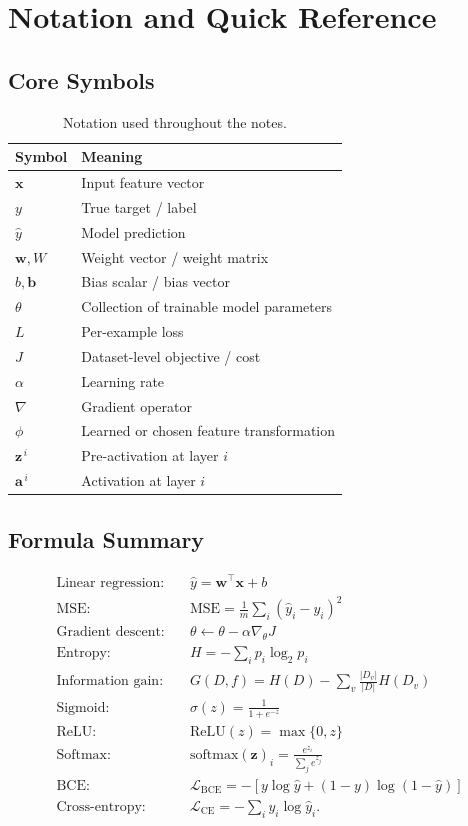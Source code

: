 \documentclass[11pt,a4paper]{report}
\newcommand{\vect}[1]{\bm{#1}}
\begin{document}
\chapter{Notation and Quick Reference}

\section{Core Symbols}
\begin{table}[H]
\centering
\caption{Notation used throughout the notes.}
\begin{tabularx}{\textwidth}{>{\bfseries}p{}X}
\toprule
\rowcolor{Primary}
\color{white}Symbol & \color{white}Meaning \\
\midrule
$\vect{x}$ & Input feature vector \\
$y$ & True target / label \\
$\hat y$ & Model prediction \\
$\vect{w},W$ & Weight vector / weight matrix \\
$b,\vect{b}$ & Bias scalar / bias vector \\
$\theta$ & Collection of trainable model parameters \\
$L$ & Per-example loss \\
$J$ & Dataset-level objective / cost \\
$\alpha$ & Learning rate \\
$\nabla$ & Gradient operator \\
$\phi$ & Learned or chosen feature transformation \\
$\vect{z}^{\,i}$ & Pre-activation at layer $i$ \\
$\vect{a}^{\,i}$ & Activation at layer $i$ \\
\bottomrule
\end{tabularx}
\end{table}

\section{Formula Summary}
\begin{align*}
\text{Linear regression:}\quad & \hat y=\vect{w}^{\top}\vect{x}+b\\
\text{MSE:}\quad & \mathrm{MSE}=\frac{1}{m}\sum_i(\hat y_i-y_i)^2\\
\text{Gradient descent:}\quad & \theta\leftarrow\theta-\alpha\nabla_\theta J\\
\text{Entropy:}\quad & H=-\sum_i p_i\log_2 p_i\\
\text{Information gain:}\quad & G(D,f)=H(D)-\sum_v\frac{|D_v|}{|D|}H(D_v)\\
\text{Sigmoid:}\quad & \sigma(z)=\frac{1}{1+e^{-z}}\\
\text{ReLU:}\quad & \mathrm{ReLU}(z)=\max\{0,z\}\\
\text{Softmax:}\quad & \mathrm{softmax}(\vect{z})_i=\frac{e^{z_i}}{\sum_j e^{z_j}}\\
\text{BCE:}\quad & \mathcal{L}_{\mathrm{BCE}}=-\left[y\log\hat y+(1-y)\log(1-\hat y)\right]\\
\text{Cross-entropy:}\quad & \mathcal{L}_{\mathrm{CE}}=-\sum_i y_i\log\hat y_i.
\end{align*}
\end{document}
